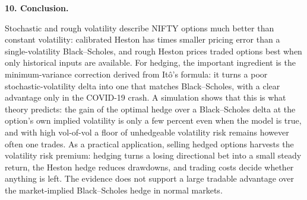 \documentclass[10pt,leqno]{amsart}
\newcommand{\heading}[1]{\medskip\noindent\textbf{#1}\par}
\begin{document}
\heading{10. Conclusion.}
\noindent Stochastic and rough volatility describe NIFTY options much better than constant volatility: calibrated Heston has \PriceFlatOverHeston{} times smaller pricing error than a single-volatility Black--Scholes, and rough Heston prices traded options best when only historical inputs are available. For hedging, the important ingredient is the minimum-variance correction derived from Itô's formula: it turns a poor stochastic-volatility delta into one that matches Black--Scholes, with a clear advantage only in the COVID-19 crash. A simulation shows that this is what theory predicts: the gain of the optimal hedge over a Black--Scholes delta at the option's own implied volatility is only a few percent even when the model is true, and with high vol-of-vol a floor of unhedgeable volatility risk remains however often one trades. As a practical application, selling hedged options harvests the volatility risk premium: hedging turns a losing directional bet into a small steady return, the Heston hedge reduces drawdowns, and trading costs decide whether anything is left. The evidence does not support a large tradable advantage over the market-implied Black--Scholes hedge in normal markets.
\end{document}
